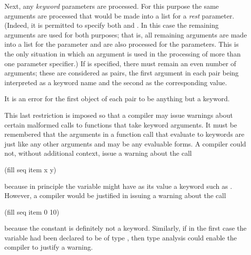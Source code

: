 Next, any \textit{keyword} parameters are processed.
For this purpose the same arguments are processed that
would be made into a list for a \textit{rest} parameter.
(Indeed, it is permitted to specify both  and .
In this case the remaining arguments are used for both purposes;
that is, all remaining arguments are made into a list for the
 parameter and are also processed for the  parameters.
This is the only situation in which an argument is used
in the processing of more than one parameter specifier.)
If  is specified, there must remain
an even number of arguments; these are considered as pairs,
the first argument in each pair being interpreted as a keyword name
and the second as the corresponding value.
\begin{obsolete}
It is an error for the first object of each pair to be
anything but a keyword.

\beforenoterule
\begin{rationale}
This last restriction is imposed so that a compiler may
issue warnings about certain malformed calls to functions
that take keyword arguments.  It must be remembered that the
arguments in a function call that evaluate to keywords are just
like any other arguments and may be any evaluable forms.
A compiler could not, without additional context, issue a warning
about the call
\begin{lisp}
(fill seq item x y)
\end{lisp}
because in principle the variable  might have as its value a keyword
such as .  However, a compiler would be justified in issuing
a warning about the call
\begin{lisp}
(fill seq item 0 10)
\end{lisp}
because the constant  is definitely not a keyword.  Similarly,
if in the first case the variable  had been declared to be
of type , then type analysis could enable the compiler
to justify a warning.
\end{rationale}
\afternoterule
\end{obsolete}


